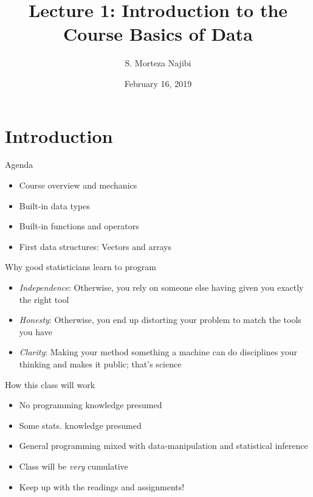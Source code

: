 \documentclass[8pt,ignorenonframetext,]{beamer}
\title{Lecture 1: Introduction to the Course Basics of Data}
\author{S. Morteza Najibi}
\institute{Shiraz University}
\date{February 16, 2019}
\providecommand{\tightlist}{%
  \setlength{\itemsep}{0pt}\setlength{\parskip}{0pt}}
\begin{document}
\frame{\titlepage}

\section{Introduction}\label{introduction}

\begin{frame}{Agenda}

\begin{itemize}
\tightlist
\item
  Course overview and mechanics
\item
  Built-in data types
\item
  Built-in functions and operators
\item
  First data structures: Vectors and arrays
\end{itemize}

\end{frame}

\begin{frame}{Why good statisticians learn to program}

\begin{itemize}
\item
  \emph{Independence}: Otherwise, you rely on someone else having given
  you exactly the right tool
\item
  \emph{Honesty}: Otherwise, you end up distorting your problem to match
  the tools you have
\item
  \emph{Clarity}: Making your method something a machine can do
  disciplines your thinking and makes it public; that's science
\end{itemize}

\end{frame}

\begin{frame}{How this class will work}

\begin{itemize}
\tightlist
\item
  No programming knowledge presumed
\item
  Some stats. knowledge presumed
\item
  General programming mixed with data-manipulation and statistical
  inference
\item
  Class will be \emph{very} cumulative
\item
  Keep up with the readings and assignments!
\end{itemize}

\end{frame}
\end{document}
